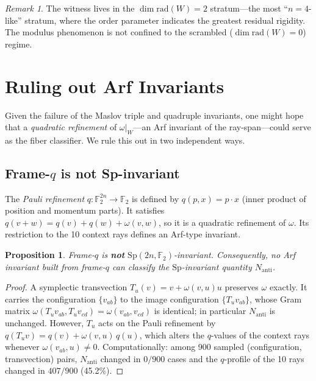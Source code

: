 \documentclass[11pt,a4paper]{article}
\newtheorem{proposition}[theorem]{Proposition}
\theoremstyle{remark}
\newtheorem{remark}[theorem]{Remark}
\newcommand{\Sp}{\mathrm{Sp}}
\newcommand{\rad}{\mathrm{rad}}
\newcommand{\Nanti}{N_{\mathrm{anti}}}
\begin{document}
\begin{remark}
The witness lives in the $\dim\rad(W)=2$ stratum---the most ``$n=4$-like'' stratum,
where the order parameter indicates the greatest residual rigidity.  The modulus
phenomenon is not confined to the scrambled ($\dim\rad(W)=0$) regime.
\end{remark}

\section{Ruling out Arf Invariants}\label{sec:arf}

Given the failure of the Maslov triple and quadruple invariants, one might hope that a
\emph{quadratic refinement} of $\omega|_W$---an Arf invariant of the ray-span---could
serve as the fiber classifier.  We rule this out in two independent ways.

\subsection{\texorpdfstring{Frame-$q$ is not Sp-invariant}{Frame-q is not Sp-invariant}}

The \emph{Pauli refinement} $q:\mathbb F_2^{2n}\to\mathbb F_2$ is defined by
$q(p,x)=p\cdot x$ (inner product of position and momentum parts).
It satisfies $q(v+w)=q(v)+q(w)+\omega(v,w)$, so it is a quadratic refinement
of $\omega$.  Its restriction to the 10 context rays defines an Arf-type invariant.

\begin{proposition}\label{prop:frameq}
Frame-$q$ is \textbf{not} $\Sp(2n,\mathbb F_2)$-invariant.  Consequently, no
Arf invariant built from frame-$q$ can classify the $\Sp$-invariant quantity $\Nanti$.
\end{proposition}

\begin{proof}
A symplectic transvection $T_u(v)=v+\omega(v,u)u$ preserves $\omega$ exactly. It
carries the configuration $\{v_{ab}\}$ to the image configuration $\{T_u v_{ab}\}$,
whose Gram matrix $\omega(T_u v_{ab},T_u v_{cd})=\omega(v_{ab},v_{cd})$ is identical;
in particular $\Nanti$ is unchanged. However, $T_u$ acts on the Pauli refinement by
$q(T_u v)=q(v)+\omega(v,u)\,q(u)$, which alters the $q$-values of the context rays
whenever $\omega(v_{ab},u)\ne0$.
Computationally: among 900 sampled (configuration, transvection) pairs, $\Nanti$ changed
in $0/900$ cases and the $q$-profile of the 10 rays changed in $407/900$ (45.2\%).
\end{proof}
\end{document}
